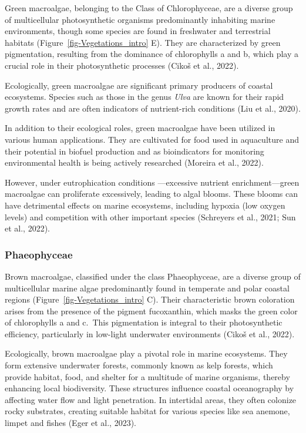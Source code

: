 \documentclass[
  letterpaper,
  11pt,
  english,
  singlespacing,
  headsepline]{MastersDoctoralThesis}
\begin{document}
\begin{spacing}{1.5}
Green macroalgae, belonging to the Class of Chlorophyceae, are a diverse
group of multicellular photosynthetic organisms predominantly inhabiting
marine environments, though some species are found in freshwater and
terrestrial habitats (Figure~\ref{fig-Vegetations_intro} E). They are
characterized by green pigmentation, resulting from the dominance of
chlorophylls a and b, which play a crucial role in their photosynthetic
processes (Cikoš et al., 2022).

Ecologically, green macroalgae are significant primary producers of
coastal ecosystems. Species such as those in the genus \emph{Ulva} are
known for their rapid growth rates and are often indicators of
nutrient-rich conditions (Liu et al., 2020).

In addition to their ecological roles, green macroalgae have been
utilized in various human applications. They are cultivated for food
used in aquaculture and their potential in biofuel production and as
bioindicators for monitoring environmental health is being actively
researched (Moreira et al., 2022).

However, under eutrophication conditions ---excessive nutrient
enrichment---green macroalgae can proliferate excessively, leading to
algal blooms. These blooms can have detrimental effects on marine
ecosystems, including hypoxia (low oxygen levels) and competition with
other important species (Schreyers et al., 2021; Sun et al., 2022).

\subsubsection{Phaeophyceae}\label{phaeophyceae}

Brown macroalgae, classified under the class Phaeophyceae, are a diverse
group of multicellular marine algae predominantly found in temperate and
polar coastal regions (Figure~\ref{fig-Vegetations_intro} C). Their
characteristic brown coloration arises from the presence of the pigment
fucoxanthin, which masks the green color of chlorophylls a and c.~This
pigmentation is integral to their photosynthetic efficiency,
particularly in low-light underwater environments (Cikoš et al., 2022).

Ecologically, brown macroalgae play a pivotal role in marine ecosystems.
They form extensive underwater forests, commonly known as kelp forests,
which provide habitat, food, and shelter for a multitude of marine
organisms, thereby enhancing local biodiversity. These structures
influence coastal oceanography by affecting water flow and light
penetration. In intertidal areas, they often colonize rocky substrates,
creating suitable habitat for various species like sea anemone, limpet
and fishes (Eger et al., 2023).


\end{spacing}
\end{document}
